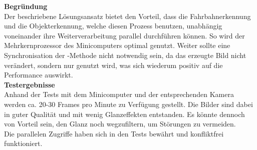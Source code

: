 \textbf{Begründung}\\[0.2cm]
Der beschriebene Lösungsansatz bietet den Vorteil, dass die Fahrbahnerkennung und die Objekterkennung, welche diesen Prozess benutzen, unabhängig voneinander ihre Weiterverarbeitung parallel durchführen können. So wird der Mehrkernprozessor des Minicomputers optimal genutzt. Weiter  sollte eine Synchronisation der -Methode nicht notwendig sein, da das erzeugte Bild nicht verändert, sondern nur genutzt wird, was sich wiederum positiv auf die Performance auswirkt.\\[0.2cm]
\textbf{Testergebnisse}\\[0.2cm]
Anhand der Tests mit dem Minicomputer und der entsprechenden Kamera werden ca. 20-30 Frames pro Minute zu Verfügung gestellt. Die Bilder sind dabei in guter Qualität und mit wenig Glanzeffekten entstanden. Es könnte dennoch von Vorteil sein, den Glanz noch wegzufiltern, um Störungen zu vermeiden.\\
Die parallelen Zugriffe haben sich in den Tests bewährt und konfliktfrei funktioniert.
